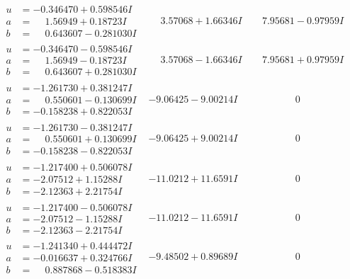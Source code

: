 \documentclass[1p]{elsarticle_modified}
\theoremstyle{definition}
\begin{document}
$$\begin{array}{c|c|c}
\begin{aligned}
u &= -0.346470 + 0.598546 I \\
a &= \phantom{-}1.56949 + 0.18723 I \\
b &= \phantom{-}0.643607 - 0.281030 I\end{aligned}
 & \phantom{-}3.57068 + 1.66346 I & \phantom{-}7.95681 - 0.97959 I \\ \hline\begin{aligned}
u &= -0.346470 - 0.598546 I \\
a &= \phantom{-}1.56949 - 0.18723 I \\
b &= \phantom{-}0.643607 + 0.281030 I\end{aligned}
 & \phantom{-}3.57068 - 1.66346 I & \phantom{-}7.95681 + 0.97959 I \\ \hline\begin{aligned}
u &= -1.261730 + 0.381247 I \\
a &= \phantom{-}0.550601 - 0.130699 I \\
b &= -0.158238 + 0.822053 I\end{aligned}
 & -9.06425 - 9.00214 I & \phantom{-0.000000 } 0 \\ \hline\begin{aligned}
u &= -1.261730 - 0.381247 I \\
a &= \phantom{-}0.550601 + 0.130699 I \\
b &= -0.158238 - 0.822053 I\end{aligned}
 & -9.06425 + 9.00214 I & \phantom{-0.000000 } 0 \\ \hline\begin{aligned}
u &= -1.217400 + 0.506078 I \\
a &= -2.07512 + 1.15288 I \\
b &= -2.12363 + 2.21754 I\end{aligned}
 & -11.0212 + 11.6591 I & \phantom{-0.000000 } 0 \\ \hline\begin{aligned}
u &= -1.217400 - 0.506078 I \\
a &= -2.07512 - 1.15288 I \\
b &= -2.12363 - 2.21754 I\end{aligned}
 & -11.0212 - 11.6591 I & \phantom{-0.000000 } 0 \\ \hline\begin{aligned}
u &= -1.241340 + 0.444472 I \\
a &= -0.016637 + 0.324766 I \\
b &= \phantom{-}0.887868 - 0.518383 I\end{aligned}
 & -9.48502 + 0.89689 I & \phantom{-0.000000 } 0 \\ \hline\begin{aligned}

\end{aligned}
\end{array}$$
\end{document}
